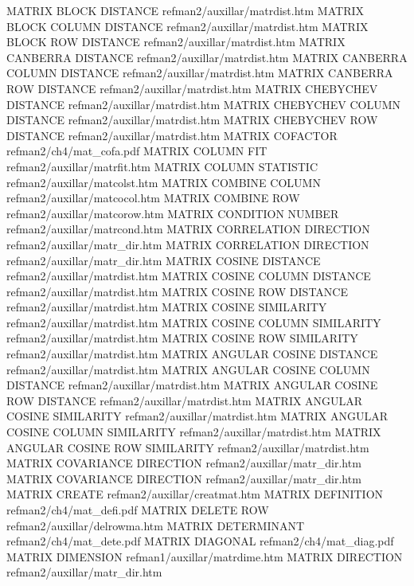 MATRIX BLOCK DISTANCE                   refman2/auxillar/matrdist.htm
MATRIX BLOCK COLUMN DISTANCE            refman2/auxillar/matrdist.htm
MATRIX BLOCK ROW DISTANCE               refman2/auxillar/matrdist.htm
MATRIX CANBERRA DISTANCE                refman2/auxillar/matrdist.htm
MATRIX CANBERRA COLUMN DISTANCE         refman2/auxillar/matrdist.htm
MATRIX CANBERRA ROW DISTANCE            refman2/auxillar/matrdist.htm
MATRIX CHEBYCHEV DISTANCE               refman2/auxillar/matrdist.htm
MATRIX CHEBYCHEV COLUMN DISTANCE        refman2/auxillar/matrdist.htm
MATRIX CHEBYCHEV ROW DISTANCE           refman2/auxillar/matrdist.htm
MATRIX COFACTOR                         refman2/ch4/mat_cofa.pdf
MATRIX COLUMN FIT                       refman2/auxillar/matrfit.htm
MATRIX COLUMN STATISTIC                 refman2/auxillar/matcolst.htm
MATRIX COMBINE COLUMN                   refman2/auxillar/matcocol.htm
MATRIX COMBINE ROW                      refman2/auxillar/matcorow.htm
MATRIX CONDITION NUMBER                 refman2/auxillar/matrcond.htm
MATRIX CORRELATION DIRECTION            refman2/auxillar/matr_dir.htm
MATRIX CORRELATION DIRECTION            refman2/auxillar/matr_dir.htm
MATRIX COSINE DISTANCE                  refman2/auxillar/matrdist.htm
MATRIX COSINE COLUMN DISTANCE           refman2/auxillar/matrdist.htm
MATRIX COSINE ROW DISTANCE              refman2/auxillar/matrdist.htm
MATRIX COSINE SIMILARITY                refman2/auxillar/matrdist.htm
MATRIX COSINE COLUMN SIMILARITY         refman2/auxillar/matrdist.htm
MATRIX COSINE ROW SIMILARITY            refman2/auxillar/matrdist.htm
MATRIX ANGULAR COSINE DISTANCE          refman2/auxillar/matrdist.htm
MATRIX ANGULAR COSINE COLUMN DISTANCE   refman2/auxillar/matrdist.htm
MATRIX ANGULAR COSINE ROW DISTANCE      refman2/auxillar/matrdist.htm
MATRIX ANGULAR COSINE SIMILARITY        refman2/auxillar/matrdist.htm
MATRIX ANGULAR COSINE COLUMN SIMILARITY refman2/auxillar/matrdist.htm
MATRIX ANGULAR COSINE ROW SIMILARITY    refman2/auxillar/matrdist.htm
MATRIX COVARIANCE DIRECTION             refman2/auxillar/matr_dir.htm
MATRIX COVARIANCE DIRECTION             refman2/auxillar/matr_dir.htm
MATRIX CREATE                           refman2/auxillar/creatmat.htm
MATRIX DEFINITION                       refman2/ch4/mat_defi.pdf
MATRIX DELETE ROW                       refman2/auxillar/delrowma.htm
MATRIX DETERMINANT                      refman2/ch4/mat_dete.pdf
MATRIX DIAGONAL                         refman2/ch4/mat_diag.pdf
MATRIX DIMENSION                        refman1/auxillar/matrdime.htm
MATRIX DIRECTION                        refman2/auxillar/matr_dir.htm
